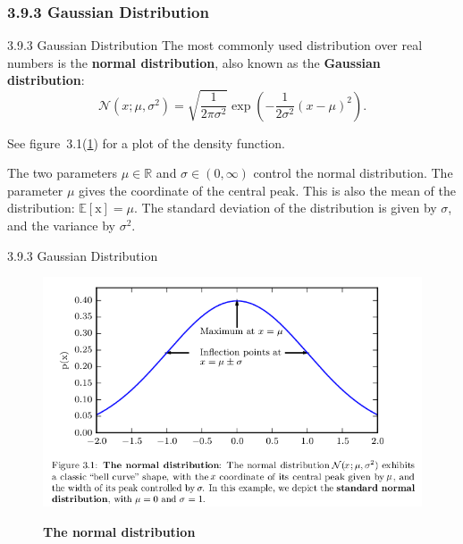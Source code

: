\subsubsection{3.9.3 Gaussian Distribution}
\begin{frame}
  {3.9.3 Gaussian Distribution}
    \justifying
    The most commonly used distribution over real numbers is the \textbf{normal distribution}, also known as the \textbf{Gaussian distribution}:
    \begin{equation}
        \mathcal{N}(x; \mu, \sigma^{2}) = \sqrt{\frac{1}{2\pi\sigma^{2}}} \exp\left(-\frac{1}{2\sigma^{2}} (x - \mu)^{2}\right).
        \label{eq:3_21}
    \end{equation}
    
    See figure~3.1(\ref{fig:3_1the_normal_distribution}) for a plot of the density function.
    
    The two parameters $\mu \in \mathbb{R}$ and $\sigma \in (0, ∞)$ control the normal distribution. The parameter $\mu$ gives the coordinate of the central peak. This is also the mean of the distribution: $\mathbb{E}[\mathrm{x}] = \mu$. The standard deviation of the distribution is given by $\sigma$, and the variance by $\sigma^{2}$.
\end{frame}

\begin{frame}{3.9.3 Gaussian Distribution}
    \begin{figure}
        \centering
        \includegraphics[scale=0.45]{images/3-1-gaussian_distribution.png}
        \label{fig:3_1the_normal_distribution}
        \caption{\textbf{The normal distribution}}
    \end{figure}
\end{frame}

